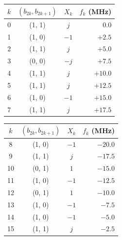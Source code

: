 \begin{tabular}{cccr}
\toprule
$k$ & $(b_{2k}, b_{2k+1})$ & $X_k$ & $f_k$ (MHz) \\
\midrule
0 & (1, 1) & $j$ & $0.0$ \\
1 & (1, 0) & $-1$ & $+2.5$ \\
2 & (1, 1) & $j$ & $+5.0$ \\
3 & (0, 0) & $-j$ & $+7.5$ \\
4 & (1, 1) & $j$ & $+10.0$ \\
5 & (1, 1) & $j$ & $+12.5$ \\
6 & (1, 0) & $-1$ & $+15.0$ \\
7 & (1, 1) & $j$ & $+17.5$ \\
\bottomrule
\end{tabular}
\hspace{2em}
\begin{tabular}{cccr}
\toprule
$k$ & $(b_{2k}, b_{2k+1})$ & $X_k$ & $f_k$ (MHz) \\
\midrule
8 & (1, 0) & $-1$ & $-20.0$ \\
9 & (1, 1) & $j$ & $-17.5$ \\
10 & (0, 1) & $1$ & $-15.0$ \\
11 & (1, 0) & $-1$ & $-12.5$ \\
12 & (0, 1) & $1$ & $-10.0$ \\
13 & (1, 0) & $-1$ & $-7.5$ \\
14 & (1, 0) & $-1$ & $-5.0$ \\
15 & (1, 1) & $j$ & $-2.5$ \\
\bottomrule
\end{tabular}
